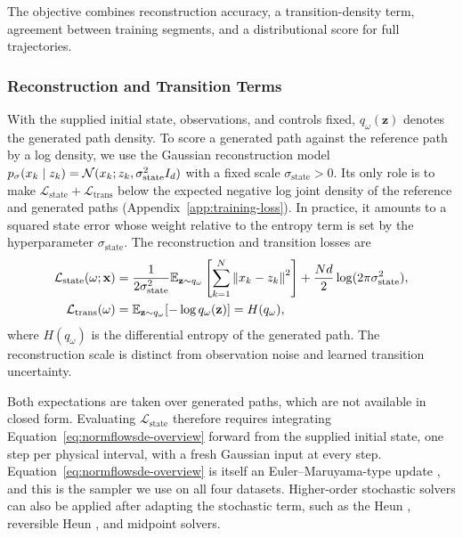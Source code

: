 The objective combines reconstruction accuracy, a transition-density term, agreement between training segments, and a distributional score for full trajectories.

\subsubsection{Reconstruction and Transition Terms}
With the supplied initial state, observations, and controls fixed, $q_\omega(\mathbf z)$ denotes the generated path density. To score a generated path against the reference path by a log density, we use the Gaussian reconstruction model $p_\sigma(x_k\mid z_k)=\mathcal N(x_k;z_k,\sigma_{\mathrm{state}}^2I_d)$ with a fixed scale $\sigma_{\mathrm{state}}>0$. Its only role is to make $\mathcal L_{\mathrm{state}}+\mathcal L_{\mathrm{trans}}$ below the expected negative log joint density of the reference and generated paths (Appendix~\ref{app:training-loss}). In practice, it amounts to a squared state error whose weight relative to the entropy term is set by the hyperparameter $\sigma_{\mathrm{state}}$. The reconstruction and transition losses are
\begin{align}
 \mathcal L_{\mathrm{state}}(\omega;\mathbf x)
 &=\frac{1}{2\sigma_{\mathrm{state}}^2}
   \mathbb E_{\mathbf z\sim q_\omega}
   \left[\sum_{k=1}^N\left\lVert x_k-z_k\right\rVert^2\right]
   +\frac{Nd}{2}\log(2\pi\sigma_{\mathrm{state}}^2),\label{eq:state-training-loss}\\
 \mathcal L_{\mathrm{trans}}(\omega)
 &=\mathbb E_{\mathbf z\sim q_\omega}[-\log q_\omega(\mathbf z)]
   =H(q_\omega),\label{eq:transition-training-loss}
\end{align}
where $H(q_\omega)$ is the differential entropy of the generated path. The reconstruction scale is distinct from observation noise and learned transition uncertainty.

Both expectations are taken over generated paths, which are not available in closed form. Evaluating $\mathcal L_{\mathrm{state}}$ therefore requires integrating Equation~\eqref{eq:normflowsde-overview} forward from the supplied initial state, one step per physical interval, with a fresh Gaussian input at every step. Equation~\eqref{eq:normflowsde-overview} is itself an Euler--Maruyama-type update \citep{kloeden1992numerical}, and this is the sampler we use on all four datasets. Higher-order stochastic solvers can also be applied after adapting the stochastic term, such as the Heun \citep{rumelin1982numerical,kloeden1992numerical}, reversible Heun \citep{kidger2021efficient}, and midpoint \citep{milstein2004stochastic} solvers.

